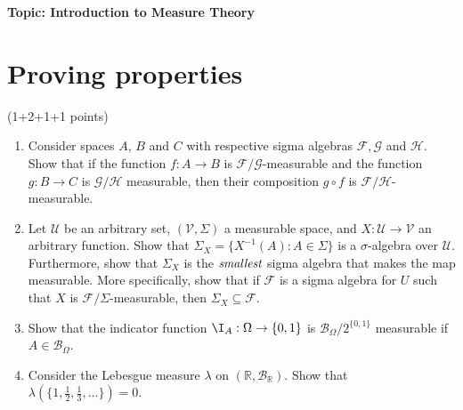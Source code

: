 
\flushleft\textbf{Topic: Introduction to Measure Theory}


\section{Proving properties}
 (1+2+1+1 points)

\begin{enumerate}
    \item Consider spaces $A$, $B$ and $C$ with respective sigma algebras $\mathcal{F}, \mathcal{G}$ and $\mathcal{H}$. Show that if the function $f: A \rightarrow B$ is $\mathcal{F} / \mathcal{G}$-measurable and the function $g: B \rightarrow C$ is $\mathcal{G} / \mathcal{H}$ measurable, then their composition $g \circ f$ is $\mathcal{F} / \mathcal{H}$-measurable.
    \item Let $\mathcal{U}$ be an arbitrary set, $(\mathcal{V}, \Sigma)$ a measurable space, and $X: \mathcal{U} \rightarrow \mathcal{V}$ an arbitrary function. Show that $\Sigma_X = \{X^{-1}(A): A \in \Sigma\}$ is a $\sigma$-algebra over $\mathcal{U}$. Furthermore, show that $\Sigma_X$ is the $\emph{smallest}$ sigma algebra that makes the map measurable. More specifically, show that if $\mathcal{F}$ is a sigma algebra for $U$ such that $X$ is $\mathcal{F}/\Sigma$-measurable, then $\Sigma_X \subseteq \mathcal{F}$.
    \item Show that the indicator function $\I_A: \Omega \rightarrow \{0,1\}$ is $\mathcal{B}_{\Omega} / 2^{\{0,1\}}$ measurable if $A \in \mathcal{B}_{\Omega}$.
    \item Consider the Lebesgue measure $\lambda$ on $(\mathbb{R}, \mathcal{B}_{\mathbb{R}})$. Show that $\lambda(\{1, \frac{1}{2}, \frac{1}{3}, \dots\})=0$.
\end{enumerate}
